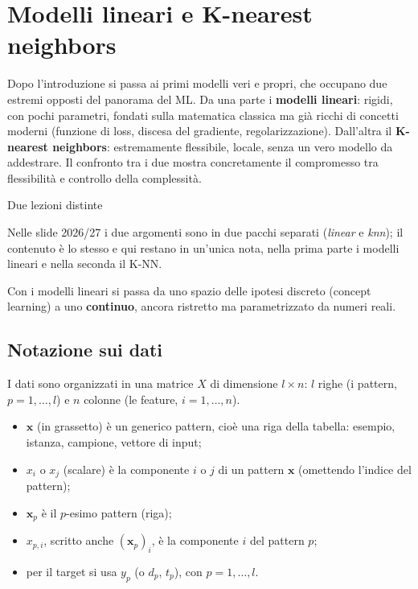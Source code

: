 \chapter{Modelli lineari e K-nearest neighbors}\label{ch-05}

Dopo l'introduzione si passa ai primi modelli veri e propri, che
occupano due estremi opposti del panorama del ML. Da una parte i
\textbf{modelli lineari}: rigidi, con pochi parametri, fondati sulla
matematica classica ma già ricchi di concetti moderni (funzione di loss,
discesa del gradiente, regolarizzazione). Dall'altra il
\textbf{K-nearest neighbors}: estremamente flessibile, locale, senza un
vero modello da addestrare. Il confronto tra i due mostra concretamente
il compromesso tra flessibilità e controllo della complessità.

\begin{boxnote}{Due lezioni distinte}

Nelle slide 2026/27 i due argomenti sono in due pacchi separati
(\emph{linear} e \emph{knn}); il contenuto è lo stesso e qui restano in
un'unica nota, nella prima parte i modelli lineari e nella seconda il
K-NN.

\end{boxnote}

Con i modelli lineari si passa da uno spazio delle ipotesi discreto
(concept learning) a uno \textbf{continuo}, ancora ristretto ma
parametrizzato da numeri reali.

\section{Notazione sui dati}\label{notazione-sui-dati}

I dati sono organizzati in una matrice \(X\) di dimensione
\(l \times n\): \(l\) righe (i pattern, \(p = 1,\dots,l\)) e \(n\)
colonne (le feature, \(i = 1,\dots,n\)).

\begin{itemize}
\tightlist
\item
  \(\mathbf{x}\) (in grassetto) è un generico pattern, cioè una riga
  della tabella: esempio, istanza, campione, vettore di input;
\item
  \(x_i\) o \(x_j\) (scalare) è la componente \(i\) o \(j\) di un
  pattern \(\mathbf{x}\) (omettendo l'indice del pattern);
\item
  \(\mathbf{x}_p\) è il \(p\)-esimo pattern (riga);
\item
  \(x_{p,i}\), scritto anche \((\mathbf{x}_p)_i\), è la componente \(i\)
  del pattern \(p\);
\item
  per il target si usa \(y_p\) (o \(d_p\), \(t_p\)), con
  \(p = 1,\dots,l\).
\end{itemize}

